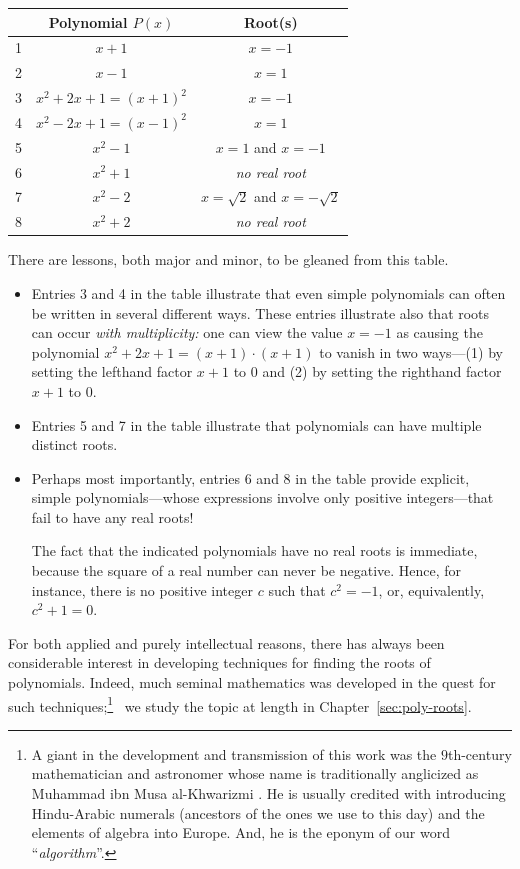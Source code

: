 \smallskip

\begin{tabular}{|c|c|c|}
\hline
 & Polynomial $P(x)$ & Root(s) \\
\hline
1 &
$x+1$  &  $x= -1$ \\
2 &
$x-1$  &  $x= 1$ \\
3 &
$x^2 + 2x +1 = (x+1)^2$ & $x = -1$ \\ 
4 &
$x^2 - 2x +1 = (x-1)^2$ & $x = 1$ \\ 
5 &
$x^2 - 1$ & $x = 1$ and $x= -1$ \\
6 &
$x^2 + 1$ & {\em no real root} \\
7 &
$x^2 -2$  & $x = \sqrt{2}$ and $x = - \sqrt{2}$ \\
8 &
$x^2 + 2$ & {\em no real root} \\
\hline
\end{tabular}

\smallskip

\noindent
There are lessons, both major and minor, to be gleaned from this table.

\begin{itemize}
\item
Entries 3 and 4 in the table illustrate that even simple polynomials
can often be written in several different ways.  These entries
illustrate also that roots can occur {\em with multiplicity:}
 one can view the value $x = -1$
as causing the polynomial $x^2 + 2x +1 = (x+1)\cdot (x+1)$ to vanish
in two ways---(1) by setting the lefthand factor $x+1$ to $0$ and
(2) by setting the righthand factor $x+1$ to $0$.

\item
Entries 5 and 7 in the table illustrate that polynomials can have
multiple distinct roots.

\item
Perhaps most importantly, entries 6 and 8 in the table provide
explicit, simple polynomials---whose expressions involve only positive
integers---that fail to have any real roots!

The fact that the indicated polynomials have no real roots is
immediate, because the square of a real number can never be negative.
Hence, for instance, there is no positive integer $c$ such that $c^2 =
-1$, or, equivalently, $c^2 + 1 = 0$.
\end{itemize}

\smallskip

For both applied and purely intellectual reasons, there has always
been considerable interest in developing techniques for finding the
roots of polynomials.  Indeed, much seminal mathematics was developed
in the quest for such techniques;\footnote{A giant in the development
  and transmission of this work was the $9$th-century mathematician
  and astronomer whose name is traditionally anglicized as Muhammad
  ibn Musa al-Khwarizmi .  He is usually
  credited with introducing Hindu-Arabic numerals (ancestors of the
  ones we use to this day) and the elements of algebra into Europe.
  And, he is the eponym of our word ``{\em algorithm}''.}~ we study
the topic at length in Chapter~\ref{sec:poly-roots}.

